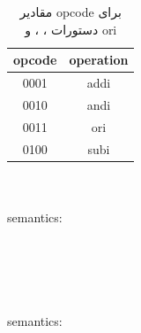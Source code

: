 \begin{table}[H]
    \centering
    \begin{tabular}{|c|c|}
    \hline
    opcode & operation \\
    \hline
    0001 & addi \\
    \hline
    0010 & andi \\
    \hline
    0011 & ori \\
    \hline
    0100 & subi \\
    \hline
    \end{tabular}
    \caption{مقادیر opcode برای دستورات ، ،  و ori}
    \label{I-Type-Opcode-Values}
\end{table}
\begin{LTR}
    \\
    \\
    {semantics:}\\
    \\
    \\
\\
    \\
    \\
    {semantics:}\\
    \\
    \\
\end{LTR}

